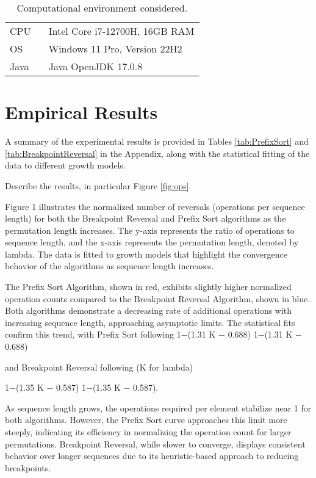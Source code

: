 \documentclass[
  11pt,
  a4paper,
]{article}
\begin{document}
\begin{table}[!h]
\caption{Computational environment considered.}
\begin{tabular}{lp{0.8\linewidth}}
\hline
CPU       & Intel Core i7-12700H, 16GB RAM \\
OS        & Windows 11 Pro, Version 22H2\\
Java      & Java OpenJDK 17.0.8\\
\hline
\end{tabular}
\label{tab:conf}
\end{table}

\section{Empirical Results}\label{empirical-results}

A summary of the experimental results is provided in Tables \ref{tab:PrefixSort} and \ref{tab:BreakpointReversal} in the Appendix, along with the statistical fitting of the data to different growth models.

Describe the results, in particular Figure \ref{fig:ops}.

Figure 1 illustrates the normalized number of reversals (operations per sequence length) for both the Breakpoint Reversal and Prefix Sort algorithms as the permutation length increases. The y-axis represents the ratio of operations to sequence length, and the x-axis represents the permutation length, denoted by
lambda. The data is fitted to growth models that highlight the convergence behavior of the algorithms as sequence length increases.

The Prefix Sort Algorithm, shown in red, exhibits slightly higher normalized operation counts compared to the Breakpoint Reversal Algorithm, shown in blue. Both algorithms demonstrate a decreasing rate of additional operations with increasing sequence length, approaching asymptotic limits. The statistical fits confirm this trend, with Prefix Sort following
1−(1.31 K − 0.688)
1−(1.31 K − 0.688)

and Breakpoint Reversal following (K for lambda)

1−(1.35 K − 0.587)
1−(1.35 K − 0.587).

As sequence length grows, the operations required per element stabilize near 1 for both algorithms. However, the Prefix Sort curve approaches this limit more steeply, indicating its efficiency in normalizing the operation count for larger permutations. Breakpoint Reversal, while slower to converge, displays consistent behavior over longer sequences due to its heuristic-based approach to reducing breakpoints.
\end{document}
